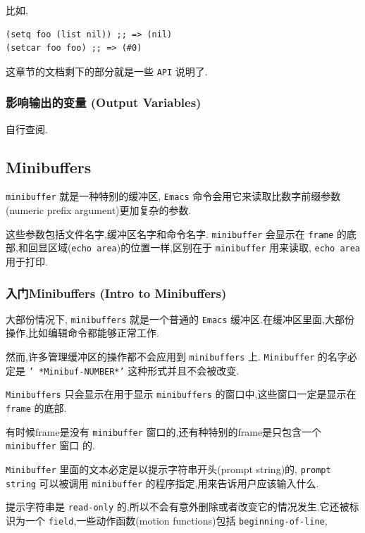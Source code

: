 \documentclass[11pt]{article}
\begin{document}
比如,

\begin{verbatim}
(setq foo (list nil)) ;; => (nil)
(setcar foo foo) ;; => (#0)
\end{verbatim}

这章节的文档剩下的部分就是一些 \texttt{API} 说明了.


\subsubsection{影响输出的变量 (Output Variables)}
\label{sec:orga07abc0}

自行查阅.


\subsection{Minibuffers}
\label{sec:orgf16628d}

\texttt{minibuffer} 就是一种特别的缓冲区, \texttt{Emacs} 命令会用它来读取比数字前缀参数(numeric prefix argument)更加复杂的参数.

这些参数包括文件名字,缓冲区名字和命令名字. \texttt{minibuffer} 会显示在 \texttt{frame} 的底部,和回显区域(\texttt{echo area})的位置一样,区别在于 \texttt{minibuffer} 用来读取, \texttt{echo area} 用于打印.

\subsubsection{入门Minibuffers (Intro to Minibuffers)}
\label{sec:org3895fe5}

大部份情况下, \texttt{minibuffers} 就是一个普通的 \texttt{Emacs} 缓冲区.在缓冲区里面,大部份操作,比如编辑命令都能够正常工作.

然而,许多管理缓冲区的操作都不会应用到 \texttt{minibuffers} 上. \texttt{Minibuffer} 的名字必定是 \texttt{' *Minibuf-NUMBER*'} 这种形式并且不会被改变.

\texttt{Minibuffers} 只会显示在用于显示 \texttt{minibuffers} 的窗口中,这些窗口一定是显示在 \texttt{frame} 的底部.

有时候frame是没有 \texttt{minibuffer} 窗口的,还有种特别的frame是只包含一个 \texttt{minibuffer} 窗口 的.

\texttt{Minibuffer} 里面的文本必定是以提示字符串开头(prompt string)的, \texttt{prompt string} 可以被调用 \texttt{minibuffer} 的程序指定,用来告诉用户应该输入什么.

提示字符串是 \texttt{read-only} 的,所以不会有意外删除或者改变它的情况发生.它还被标识为一个 \texttt{field},一些动作函数(motion functions)包括 \texttt{beginning-of-line},
\end{document}
